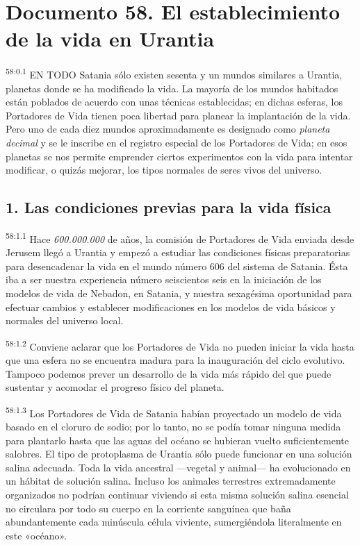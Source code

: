 \chapter{Documento 58. El establecimiento de la vida en Urantia}
\par
\textsuperscript{58:0.1} EN TODO Satania sólo existen sesenta y un mundos similares a Urantia, planetas donde se ha modificado la vida. La mayoría de los mundos habitados están poblados de acuerdo con unas técnicas establecidas; en dichas esferas, los Portadores de Vida tienen poca libertad para planear la implantación de la vida. Pero uno de cada diez mundos aproximadamente es designado como \textit{planeta decimal} y se le inscribe en el registro especial de los Portadores de Vida; en esos planetas se nos permite emprender ciertos experimentos con la vida para intentar modificar, o quizás mejorar, los tipos normales de seres vivos del universo.

\section*{1. Las condiciones previas para la vida física}
\par
\textsuperscript{58:1.1} Hace \textit{600.000.000} de años, la comisión de Portadores de Vida enviada desde Jerusem llegó a Urantia y empezó a estudiar las condiciones físicas preparatorias para desencadenar la vida en el mundo número 606 del sistema de Satania. Ésta iba a ser nuestra experiencia número seiscientos seis en la iniciación de los modelos de vida de Nebadon, en Satania, y nuestra sexagésima oportunidad para efectuar cambios y establecer modificaciones en los modelos de vida básicos y normales del universo local.

\par
\textsuperscript{58:1.2} Conviene aclarar que los Portadores de Vida no pueden iniciar la vida hasta que una esfera no se encuentra madura para la inauguración del ciclo evolutivo. Tampoco podemos prever un desarrollo de la vida más rápido del que puede sustentar y acomodar el progreso físico del planeta.

\par
\textsuperscript{58:1.3} Los Portadores de Vida de Satania habían proyectado un modelo de vida basado en el cloruro de sodio; por lo tanto, no se podía tomar ninguna medida para plantarlo hasta que las aguas del océano se hubieran vuelto suficientemente salobres. El tipo de protoplasma de Urantia sólo puede funcionar en una solución salina adecuada. Toda la vida ancestral ---vegetal y animal--- ha evolucionado en un hábitat de solución salina. Incluso los animales terrestres extremadamente organizados no podrían continuar viviendo si esta misma solución salina esencial no circulara por todo su cuerpo en la corriente sanguínea que baña abundantemente cada minúscula célula viviente, sumergiéndola literalmente en este «océano».

